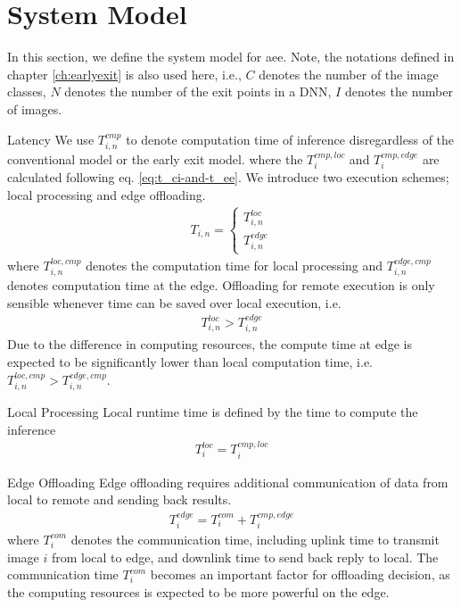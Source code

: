 \section{System Model} \label{sec:edge-system-model}
In this section, we define the system model for \gls{aee}. Note, the notations defined in chapter \ref{ch:earlyexit} is also used here, i.e., $ C $ denotes the number of the image classes, $ N $ denotes the number of the exit points in a DNN, $ I $ denotes the number of images. 	
\begin{enumdescript}
	\item[Latency]  We use $ T_{i,n}^{cmp} $ to denote computation time of inference disregardless of the conventional model or the early exit model. 
	where the $ T_i^{cmp,loc} $ and $ T_i^{cmp,edge} $ are calculated following eq. \ref{eq:t_ci-and-t_ee}.
	We introduce two execution schemes; local processing and edge offloading.
	\begin{align}
	T_{i,n} = \begin{cases}
	T_{i,n}^{loc} \\
	T_{i,n}^{edge}
	\end{cases}
	\end{align}
	where $ T_{i,n}^{loc,cmp} $ denotes the computation time for local processing  and $ T_{i,n}^{edge,cmp} $ denotes computation time at the edge. 
	Offloading for remote execution is only sensible whenever time can be saved over local execution, i.e.
	\begin{align*}
	T_{i,n}^{loc} > T_{i,n}^{edge}
	\end{align*}
	Due to the difference in computing resources, the compute time at edge is expected to be significantly lower than local computation time, i.e. $ T_{i,n}^{loc,cmp} > T_{i,n}^{edge,cmp} $. 
	
	
	\begin{enumdescript}
		\item[Local Processing] Local runtime time is defined by the time to compute the inference
		\begin{align}
		T_{i}^{loc}= T_{i}^{cmp,loc}
		\end{align}
		\item[Edge Offloading] Edge offloading requires additional communication of data from local to remote and sending back results.
		\begin{align}
		T_{i}^{edge}=T_{i}^{com}+ T_{i}^{cmp,edge}
		\end{align}
		where $ T^{com}_i $ denotes the communication time, including uplink time to transmit image $ i $ from local to edge, and downlink time to send back reply to local. The communication time $ T^{com}_i $ becomes an important factor for offloading decision, as the computing resources is expected to be more powerful on the edge.			
		

\end{enumdescript}
\end{enumdescript}
